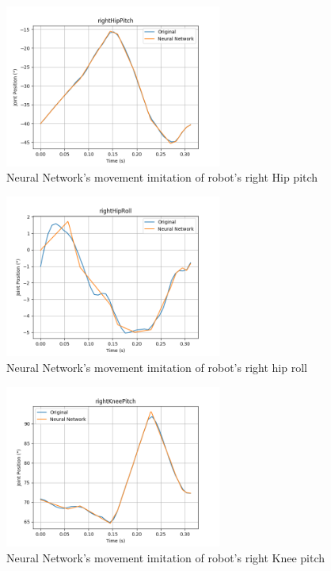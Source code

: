 \documentclass[journal]{IEEEtran}
\begin{document}
\begin{figure}
  \begin{center}
  \includegraphics[width=2.8in]{./../code/imitation_learning_result/rightHipPitch.png}
  \caption{Neural Network's movement imitation of robot's right Hip pitch}
  \label{img:right_hip_pitch}
  \end{center}
\end{figure}

\begin{figure}
  \begin{center}
  \includegraphics[width=2.8in]{./../code/imitation_learning_result/rightHipRoll.png}
  \caption{Neural Network's movement imitation of robot's right hip roll}
  \label{img:right_hip_roll}
  \end{center}
\end{figure}

\begin{figure}
  \begin{center}
  \includegraphics[width=2.8in]{./../code/imitation_learning_result/rightKneePitch.png}
  \caption{Neural Network's movement imitation of robot's right Knee pitch}
  \label{img:right_knee_pitch}
  \end{center}
\end{figure}
\end{document}
